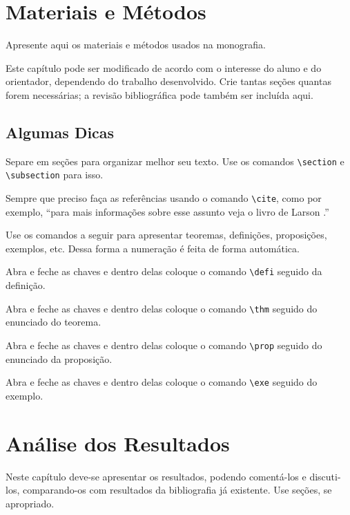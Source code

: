 \documentclass[12pt,a4paper,header]{abnt}
\begin{document}
\chapter{Materiais e Métodos}

Apresente aqui os materiais e métodos usados na monografia. 

Este capítulo pode ser modificado de acordo com o interesse do aluno e do orientador, dependendo do trabalho desenvolvido. Crie tantas seções quantas forem necessárias; a revisão bibliográfica pode também ser incluída aqui.


\section{Algumas Dicas}

Separe em seções para organizar melhor seu texto. Use os comandos \verb|\section| e \verb|\subsection| para isso. 

Sempre que preciso faça as referências usando o comando \verb|\cite|, como por exemplo, ``para mais informações sobre esse assunto veja o livro de Larson \cite{larson}.''

Use os comandos a seguir para apresentar teoremas, definições, proposições, exemplos, etc. Dessa forma a numeração é feita de forma automática. 

{
Abra e feche as chaves e dentro delas coloque o comando \verb|\defi| seguido da definição. 
}

{\thm
Abra e feche as chaves e dentro delas coloque o comando \verb|\thm| seguido do enunciado do teorema. 
}

{\prop
Abra e feche as chaves e dentro delas coloque o comando \verb|\prop| seguido do enunciado da proposição.
}


{\exe
Abra e feche as chaves e dentro delas coloque o comando \verb|\exe| seguido do exemplo.
}




\chapter{Análise dos Resultados}


Neste capítulo deve-se apresentar os resultados, podendo comentá-los e discuti-los, comparando-os com resultados da bibliografia já existente. Use seções, se apropriado.
\end{document}
